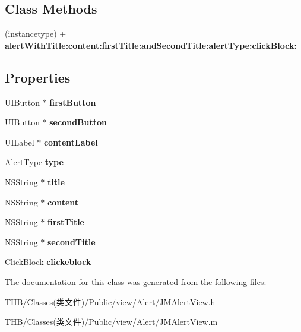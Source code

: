 \subsection*{Class Methods}
\begin{DoxyCompactItemize}
\item 
\mbox{\label{interface_j_m_alert_view_a349bb851aed1218d840b8e60b15b257d}} 
(instancetype) + {\bfseries alert\+With\+Title\+:content\+:first\+Title\+:and\+Second\+Title\+:alert\+Type\+:click\+Block\+:}
\end{DoxyCompactItemize}
\subsection*{Properties}
\begin{DoxyCompactItemize}
\item 
\mbox{\label{interface_j_m_alert_view_ae264c93461624a3a037dbc4d9e63d155}} 
U\+I\+Button $\ast$ {\bfseries first\+Button}
\item 
\mbox{\label{interface_j_m_alert_view_ac27c00cfc9beba63c26fc7e00c47069f}} 
U\+I\+Button $\ast$ {\bfseries second\+Button}
\item 
\mbox{\label{interface_j_m_alert_view_a38db17dfc2f8d80f592e9d2770bf2801}} 
U\+I\+Label $\ast$ {\bfseries content\+Label}
\item 
\mbox{\label{interface_j_m_alert_view_aa4bec9caae00f71dfce723b9f7c01499}} 
Alert\+Type {\bfseries type}
\item 
\mbox{\label{interface_j_m_alert_view_afa63436d06917f456d2c32052b660e1d}} 
N\+S\+String $\ast$ {\bfseries title}
\item 
\mbox{\label{interface_j_m_alert_view_a022d8ef88bb91adf595a56ef71c501bb}} 
N\+S\+String $\ast$ {\bfseries content}
\item 
\mbox{\label{interface_j_m_alert_view_a0fd4ce0df0101fb43af49ed3f0166329}} 
N\+S\+String $\ast$ {\bfseries first\+Title}
\item 
\mbox{\label{interface_j_m_alert_view_a6278b68281982514eb1211d757faf106}} 
N\+S\+String $\ast$ {\bfseries second\+Title}
\item 
\mbox{\label{interface_j_m_alert_view_aa32ed67aba2429be313486fa40de3282}} 
Click\+Block {\bfseries clickeblock}
\end{DoxyCompactItemize}


The documentation for this class was generated from the following files\+:\begin{DoxyCompactItemize}
\item 
T\+H\+B/\+Classes(类文件)/\+Public/view/\+Alert/J\+M\+Alert\+View.\+h\item 
T\+H\+B/\+Classes(类文件)/\+Public/view/\+Alert/J\+M\+Alert\+View.\+m\end{DoxyCompactItemize}
